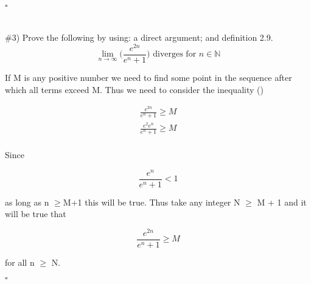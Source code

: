 \documentclass[11pt]{article}
\begin{document}
$\square$

\section{}

\#3) Prove the following by using: a direct argument; and definition 2.9.
\begin{equation}
	\lim_{n \rightarrow \infty} \bigg(\frac{e^{2n}}{e^n+1}\bigg)\text{ diverges for }n \in \mathbb{N}
\end{equation}

If M is any positive number we need to find some point in the sequence after which all terms exceed M. Thus we need to consider the inequality (\cite{tbb})

\begin{equation}
	\begin{aligned}
		\frac{e^{2n}}{e^n+1}\ge M \\
		\frac{e^2 e^n}{e^n+1}\ge M \\
	\end{aligned}
\end{equation}

Since

\begin{equation}
	\frac{e^{n}}{e^n+1} < 1
\end{equation}

as long as n $\ge$M+1 this will be true. Thus take any integer N $\ge$ M + 1 and it will be true that

\begin{equation}
	\frac{e^{2n}}{e^n+1}\ge M
\end{equation}

for all n $\ge$ N.

$\square$

\printbibliography
\end{document}
